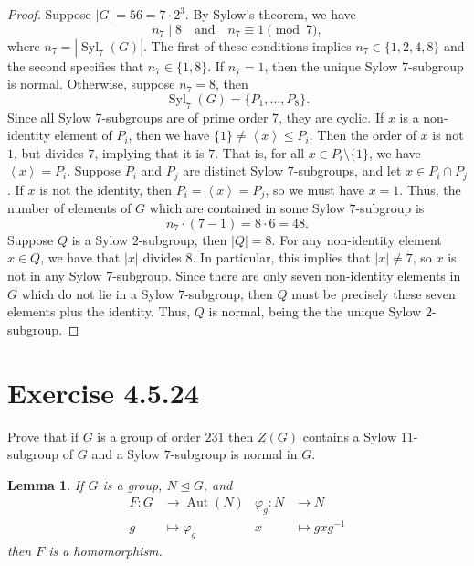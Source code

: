 \documentclass[12pt]{article}
\newenvironment{problem}
    {\begin{lrbox}{\mybox}\begin{minipage}{0.98\textwidth}}
    {\end{minipage}\end{lrbox}\framebox[\textwidth]{\usebox{\mybox}}}
\newtheorem{lemma}{Lemma}
\newcommand{\isp}[1]{\quad\text{#1}\quad}
\renewcommand{\phi}{\varphi}
\newcommand{\teq}{\trianglelefteq}
\newcommand{\Syl}{\operatorname{Syl}}
\newcommand{\<}{\left\langle}
\renewcommand{\>}{\right\rangle}
\newcommand{\Aut}{\operatorname{Aut}}
\begin{document}
\begin{proof}
    Suppose $|G| = 56 = 7 \cdot 2^3$. By Sylow's theorem, we have
    \[
         n_7 \mid 8 \isp{and} n_7 \equiv 1 \pmod{7},
    \]
    where $n_7 = |\Syl_7(G)|$. The first of these conditions implies $n_7 \in \{1, 2, 4, 8\}$ and the second specifies that $n_7 \in \{1, 8\}$. If $n_7 = 1$, then the unique Sylow $7$-subgroup is normal. Otherwise, suppose $n_7 = 8$, then
    \[
        \Syl_7(G) = \{P_1, \dots, P_8\}.
    \]
    Since all Sylow $7$-subgroups are of prime order $7$, they are cyclic. If $x$ is a non-identity element of $P_i$, then we have $\{1\} \ne \<x\> \leq P_i$. Then the order of $x$ is not $1$, but divides $7$, implying that it is $7$. That is, for all $x \in P_i \setminus \{1\}$, we have $\<x\> = P_i$. Suppose $P_i$ and $P_j$ are distinct Sylow $7$-subgroups, and let $x \in P_i \cap P_j$. If $x$ is not the identity, then $P_i = \<x\> = P_j$, so we must have $x = 1$. Thus, the number of elements of $G$ which are contained in some Sylow $7$-subgroup is
    \[
        n_7 \cdot (7 - 1) = 8 \cdot 6 = 48.
    \]
    Suppose $Q$ is a Sylow $2$-subgroup, then $|Q| = 8$. For any non-identity element $x \in Q$, we have that $|x|$ divides $8$. In particular, this implies that $|x| \ne 7$, so $x$ is not in any Sylow $7$-subgroup. Since there are only seven non-identity elements in $G$ which do not lie in a Sylow $7$-subgroup, then $Q$ must be precisely these seven elements plus the identity. Thus, $Q$ is normal, being the the unique Sylow $2$-subgroup.
    
\end{proof}

\newpage
\section{Exercise 4.5.24}
\begin{problem}
    Prove that if $G$ is a group of order $231$ then $Z(G)$ contains a Sylow $11$-subgroup of $G$ and a Sylow $7$-subgroup is normal in $G$.
\end{problem}

\begin{lemma}
    If $G$ is a group, $N \teq G$, and
    \begin{align*}
        F : G &\to \Aut(N)      &  \phi_g : N &\to N \\
            g &\mapsto \phi_g   &             x &\mapsto gxg^{-1}
    \end{align*}
    then $F$ is a homomorphism.
\end{lemma}
\end{document}
